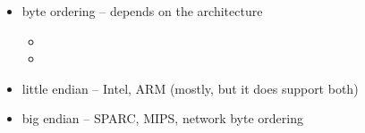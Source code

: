 
\begin{slide}
\begin{itemize}
\item byte ordering -- depends on the architecture
    \begin{itemize}
    \item {}
    \item {}
    \end{itemize}
\item little endian -- Intel, ARM (mostly, but it does support both)
\item big endian -- SPARC, MIPS, network byte ordering
\end{itemize}
\end{slide}

\label{BYTE_ORDERING}

